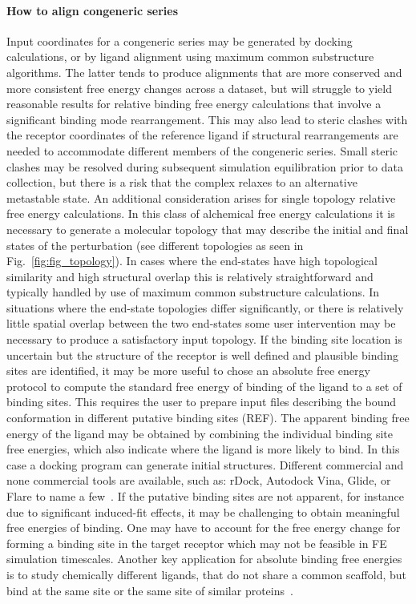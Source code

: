 \documentclass[9pt,bestpractices]{livecoms}
\begin{document}
\paragraph{How to align congeneric series}
Input coordinates for a congeneric series may be generated by docking calculations, or by ligand alignment using maximum common substructure algorithms. The latter tends to produce alignments that are more conserved and more consistent free energy changes across a dataset, but will struggle to yield reasonable results for relative binding free energy calculations that involve a significant binding mode rearrangement. This may also lead to steric clashes with the receptor coordinates of the reference ligand if structural rearrangements are needed to accommodate different members of the congeneric series. Small steric clashes may be resolved during subsequent simulation equilibration prior to data collection, but there is a risk that the complex relaxes to an alternative metastable state. 
%
An additional consideration arises for single topology relative free energy calculations. In this class of alchemical free energy calculations it is necessary to generate a molecular topology that may describe the initial and final states of the perturbation (see different topologies as seen in Fig.~\ref{fig:fig_topology}). In cases where the end-states have high topological similarity and high structural overlap this is relatively straightforward and typically handled by use of maximum common substructure calculations. In situations where the end-state topologies differ significantly, or there is relatively little spatial overlap between the two end-states some user intervention may be necessary to produce a satisfactory input topology.
%
If the binding site location is uncertain but the structure of the receptor is well defined and plausible binding sites are identified, it may be more useful to chose an absolute free energy protocol to compute the standard free energy of binding of the ligand to a set of binding sites. This requires the user to prepare input files describing the bound conformation in different putative binding sites (REF). The apparent binding free energy of the ligand may be obtained by combining the individual binding site free energies, which also indicate where the ligand is more likely to bind. In this case a docking program can generate initial structures. Different commercial and none commercial tools are available, such as: rDock, Autodock Vina, Glide, or Flare to name a few~\cite{ruiz-carmona2014rdock, trott2010autodock, friesner2004glide, cheeseright2006molecular}. 
If the putative binding sites are not apparent, for instance due to significant induced-fit effects, it may be challenging to obtain meaningful free energies of binding. One may have to account for the free energy change for forming a binding site in the target receptor which may not be feasible in FE simulation timescales. Another key application for absolute binding free energies is to study chemically different ligands, that do not share a common scaffold, but bind at the same site or the same site of similar proteins~\cite{aldeghi2015accurate}.  
%
\end{document}
